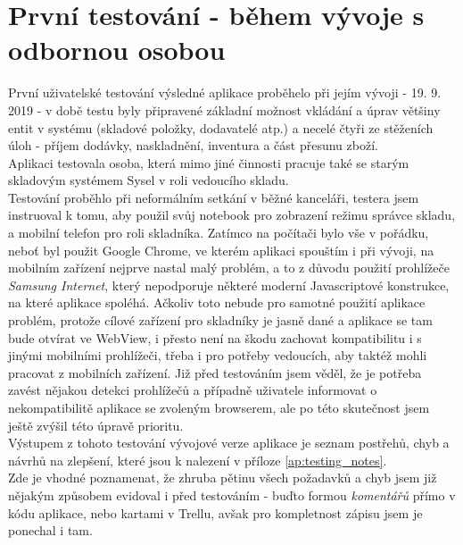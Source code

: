\section{První testování - během vývoje s odbornou osobou}

První uživatelské testování výsledné aplikace proběhelo při jejím vývoji - 19. 9. 2019 - v době testu byly připravené základní možnost vkládání a úprav většiny entit v systému (skladové položky, dodavatelé atp.) a necelé čtyři ze stěženích úloh - příjem dodávky, naskladnění, inventura a část přesunu zboží.\\
Aplikaci testovala osoba, která mimo jiné činnosti pracuje také se starým skladovým systémem Sysel v roli vedoucího skladu.\\
Testování proběhlo při neformálním setkání v běžné kanceláři, testera jsem instruoval k tomu, aby použil svůj notebook pro zobrazení režimu správce skladu, a mobilní telefon pro roli skladníka. Zatímco na počítači bylo vše v pořádku, neboť byl použit Google Chrome, ve kterém aplikaci spouštím i při vývoji, na mobilním zařízení nejprve nastal malý problém, a to z důvodu použití prohlížeče \emph{Samsung Internet}, který nepodporuje některé moderní Javascriptové konstrukce, na které aplikace spoléhá. Ačkoliv toto nebude pro samotné použití aplikace problém, protože cílové zařízení pro skladníky je jasně dané a aplikace se tam bude otvírat ve WebView, i přesto není na škodu zachovat kompatibilitu i s jinými mobilními prohlížeči, třeba i pro potřeby vedoucích, aby taktéž mohli pracovat z mobilních zařízení. Již před testováním jsem věděl, že je potřeba zavést nějakou detekci prohlížečů a případně uživatele informovat o nekompatibilitě aplikace se zvoleným browserem, ale po této skutečnost jsem ještě zvýšil této úpravě prioritu.\\
Výstupem z tohoto testování vývojové verze aplikace je seznam postřehů, chyb a návrhů na zlepšení, které jsou k nalezení v příloze \ref{ap:testing_notes}.\\
Zde je vhodné poznamenat, že zhruba pětinu všech požadavků a chyb jsem již nějakým způsobem evidoval i před testováním - buďto formou \emph{ komentářů} přímo v kódu aplikace, nebo kartami v Trellu, avšak pro kompletnost zápisu jsem je ponechal i tam.


